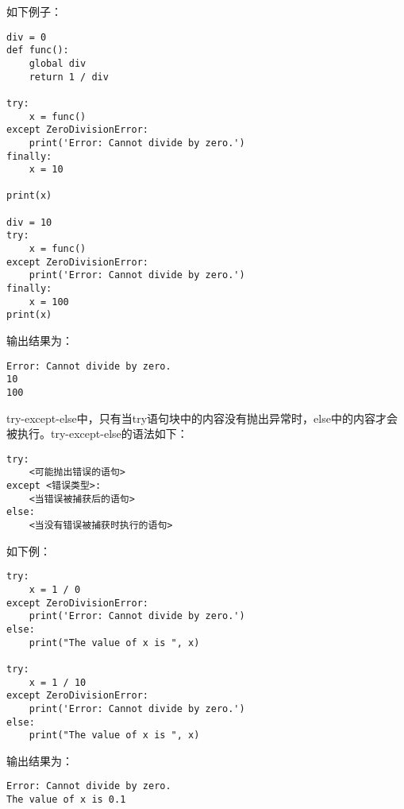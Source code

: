 如下例子：

\begin{lstlisting}
div = 0
def func():
    global div
    return 1 / div

try:
    x = func()
except ZeroDivisionError:
    print('Error: Cannot divide by zero.')
finally:
    x = 10

print(x)

div = 10
try:
    x = func()
except ZeroDivisionError:
    print('Error: Cannot divide by zero.')
finally:
    x = 100
print(x)
\end{lstlisting}

输出结果为：
\begin{lstlisting}
Error: Cannot divide by zero.
10
100
\end{lstlisting}

try-except-else中，只有当try语句块中的内容没有抛出异常时，else中的内容才会被执行。try-except-else的语法如下：
\begin{lstlisting}
try:
    <可能抛出错误的语句>
except <错误类型>:
    <当错误被捕获后的语句>
else:
    <当没有错误被捕获时执行的语句>
\end{lstlisting}

如下例：

\begin{lstlisting}
try:
    x = 1 / 0
except ZeroDivisionError:
    print('Error: Cannot divide by zero.')
else:
    print("The value of x is ", x)

try:
    x = 1 / 10
except ZeroDivisionError:
    print('Error: Cannot divide by zero.')
else:
    print("The value of x is ", x)
\end{lstlisting}

输出结果为：

\begin{lstlisting}
Error: Cannot divide by zero.
The value of x is 0.1
\end{lstlisting}